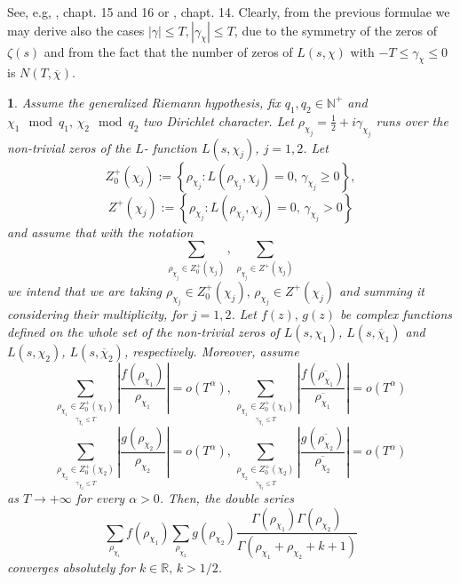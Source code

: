\documentclass[10pt,a4paper]{amsart}
\numberwithin{equation}{section}
\numberwithin{figure}{section}
\newtheorem{thm}{\protect\theoremname}
\providecommand{\theoremname}{Theorem}
\begin{document}
See, e.g, \cite{DAVEN}, chapt. 15 and 16 or \cite{MV2006}, chapt.
14. Clearly, from the previous formulae we may derive also the cases
$\left|\gamma\right|\leq T,\left|\gamma_{\chi}\right|\leq T$, due
to the symmetry of the zeros of $\zeta\left(s\right)$ and from the
fact that the number of zeros of $L\left(s,\chi\right)$ with $-T\leq\gamma_{\chi}\leq0$
is $N\left(T,\overline{\chi}\right)$.

\begin{thm}
\label{thm:dobule series =00005Cchi}Assume the generalized Riemann
hypothesis, fix $q_{1},q_{2}\in\mathbb{N}^{+}$ and $\chi_{1}\mod q_{1},\,\chi_{2}\mod q_{2}$
two Dirichlet character. Let $\rho_{\chi_{j}}=\frac{1}{2}+i\gamma_{\chi_{j}}$
runs over the non-trivial zeros of the $L$- function $L(s,\chi_{j})$,
$j=1,2$. Let 
\[
Z_{0}^{+}\left(\chi_{j}\right):=\left\{ \rho_{\chi_{j}}:L\left(\rho_{\chi_{j}},\chi_{j}\right)=0,\,\gamma_{\chi_{j}}\geq0\right\} ,
\]
\[
Z^{+}\left(\chi_{j}\right):=\left\{ \rho_{\chi_{j}}:L\left(\rho_{\chi_{j}},\chi_{j}\right)=0,\,\gamma_{\chi_{j}}>0\right\} 
\]
and assume that with the notation
\[
\sum_{\rho_{\chi_{j}}\in Z_{0}^{+}\left(\chi_{j}\right)},\,\sum_{\rho_{\chi_{j}}\in Z^{+}\left(\chi_{j}\right)}
\]
we intend that we are taking $\rho_{\chi_{j}}\in Z_{0}^{+}\left(\chi_{j}\right),\,\rho_{\chi_{j}}\in Z^{+}\left(\chi_{j}\right)$
and summing it considering their multiplicity, for $j=1,2$. Let $f\left(z\right),\,g\left(z\right)$
be complex functions defined on the whole set of the non-trivial zeros
of $L\left(s,\chi_{1}\right)$, $L\left(s,\overline{\chi}_{1}\right)$
and $L\left(s,\chi_{2}\right)$, $L\left(s,\overline{\chi}_{2}\right)$,
respectively. Moreover, assume
\[
\sum_{\underset{{\scriptstyle \gamma_{\chi_{1}}\leq T}}{\rho_{\chi_{1}}\in Z_{0}^{+}\left(\chi_{1}\right)}}\left|\frac{f\left(\rho_{\chi_{1}}\right)}{\rho_{\chi_{1}}}\right|=o\left(T^{\alpha}\right),\,\sum_{\underset{{\scriptstyle \gamma_{\chi_{1}}\leq T}}{\rho_{\chi_{1}}\in Z_{0}^{+}\left(\chi_{1}\right)}}\left|\frac{f\left(\overline{\rho_{\chi_{1}}}\right)}{\overline{\rho_{\chi_{1}}}}\right|=o\left(T^{\alpha}\right)
\]
\[
\sum_{\underset{{\scriptstyle \gamma_{\chi_{2}}\leq T}}{\rho_{\chi_{2}}\in Z_{0}^{+}\left(\chi_{2}\right)}}\left|\frac{g\left(\rho_{\chi_{2}}\right)}{\rho_{\chi_{2}}}\right|=o\left(T^{\alpha}\right),\,\sum_{\underset{{\scriptstyle \gamma_{\chi_{2}}\leq T}}{\rho_{\chi_{2}}\in Z_{0}^{+}\left(\chi_{2}\right)}}\left|\frac{g\left(\overline{\rho_{\chi_{2}}}\right)}{\overline{\rho_{\chi_{2}}}}\right|=o\left(T^{\alpha}\right)
\]
as $T\rightarrow+\infty$ for every $\alpha>0$. Then, the double
series
\[
\sum_{\rho_{\chi_{1}}}f\left(\rho_{\chi_{1}}\right)\sum_{\rho_{\chi_{2}}}g\left(\rho_{\chi_{2}}\right)\frac{\Gamma\left(\rho_{\chi_{1}}\right)\Gamma\left(\rho_{\chi_{2}}\right)}{\Gamma\left(\rho_{\chi_{1}}+\rho_{\chi_{2}}+k+1\right)}
\]
converges absolutely for $k\in\mathbb{R},\,k>1/2$.
\end{thm}
\end{document}
